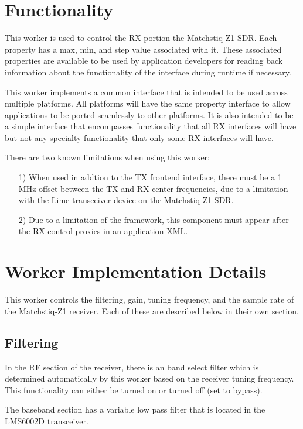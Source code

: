 \section*{Functionality}
\begin{flushleft}
	This worker is used to control the RX portion the Matchstiq-Z1 SDR.  Each property has a max, min, and step value associated with it.  These associated properties are available to be used by application developers for reading back information about the functionality of the interface during runtime if necessary.\par\medskip
	This worker implements a common interface that is intended to be used across multiple platforms.  All platforms will have the same property interface to allow applications to be ported seamlessly to other platforms.  It is also intended to be a simple interface that encompasses functionality that all RX interfaces will have but not any specialty functionality that only some RX interfaces will have.\par\medskip
	There are two known limitations when using this worker:
	\begin{itemize}
		\item[1)] When used in addtion to the TX frontend interface, there must be a 1 MHz offset between the TX and RX center frequencies, due to a limitation with the Lime transceiver device on the Matchstiq-Z1 SDR.
		\item[2)] Due to a limitation of the framework, this component must appear after the RX control proxies in an application XML.
	\end{itemize}

\section*{Worker Implementation Details}
	This worker controls the filtering, gain, tuning frequency, and the sample rate of the Matchstiq-Z1 receiver.  Each of these are described below in their own section.
\end{flushleft}
\subsection*{Filtering}
In the RF section of the receiver, there is an band select filter which is determined automatically by this worker based on the receiver tuning frequency.  This functionality can either be turned on or turned off (set to bypass).\par\medskip
\noindent The baseband section has a variable low pass filter that is located in the LMS6002D transceiver.
